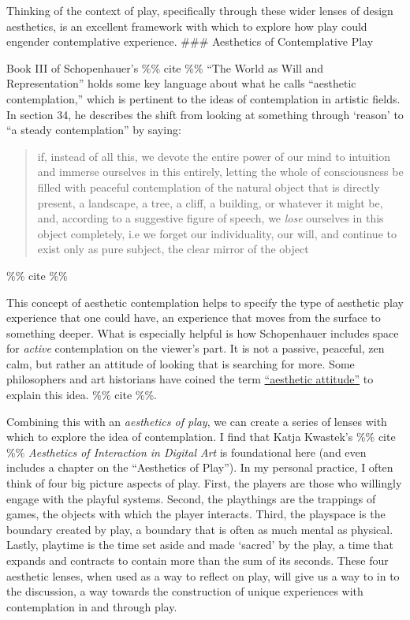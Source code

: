 \documentclass[
]{article}
\begin{document}
Thinking of the context of play, specifically through these wider lenses
of design aesthetics, is an excellent framework with which to explore
how play could engender contemplative experience. \#\#\# Aesthetics of
Contemplative Play

Book III of Schopenhauer's \%\% cite \%\% ``The World as Will and
Representation'' holds some key language about what he calls ``aesthetic
contemplation,'' which is pertinent to the ideas of contemplation in
artistic fields. In section 34, he describes the shift from looking at
something through `reason' to ``a steady contemplation'' by saying:

\begin{quote}
if, instead of all this, we devote the entire power of our mind to
intuition and immerse ourselves in this entirely, letting the whole of
consciousness be filled with peaceful contemplation of the natural
object that is directly present, a landscape, a tree, a cliff, a
building, or whatever it might be, and, according to a suggestive figure
of speech, we \emph{lose} ourselves in this object completely, i.e we
forget our individuality, our will, and continue to exist only as pure
subject, the clear mirror of the object
\end{quote}

\%\% cite \%\%

This concept of aesthetic contemplation helps to specify the type of
aesthetic play experience that one could have, an experience that moves
from the surface to something deeper. What is especially helpful is how
Schopenhauer includes space for \emph{active} contemplation on the
viewer's part. It is not a passive, peaceful, zen calm, but rather an
attitude of looking that is searching for more. Some philosophers and
art historians have coined the term
\href{https://iep.utm.edu/aesthetic-attitude/}{``aesthetic attitude''}
to explain this idea. \%\% cite \%\%.

Combining this with an \emph{aesthetics of play}, we can create a series
of lenses with which to explore the idea of contemplation. I find that
Katja Kwastek's \%\% cite \%\% \emph{Aesthetics of Interaction in
Digital Art} is foundational here (and even includes a chapter on the
``Aesthetics of Play''). In my personal practice, I often think of four
big picture aspects of play. First, the players are those who willingly
engage with the playful systems. Second, the playthings are the
trappings of games, the objects with which the player interacts. Third,
the playspace is the boundary created by play, a boundary that is often
as much mental as physical. Lastly, playtime is the time set aside and
made `sacred' by the play, a time that expands and contracts to contain
more than the sum of its seconds. These four aesthetic lenses, when used
as a way to reflect on play, will give us a way to in to the discussion,
a way towards the construction of unique experiences with contemplation
in and through play.
\end{document}
